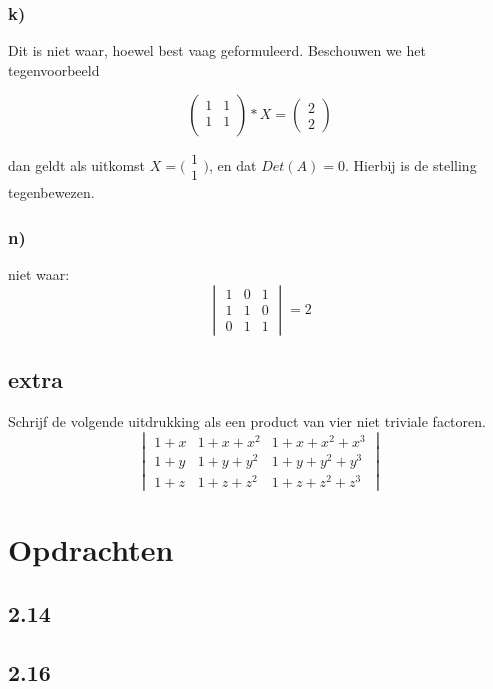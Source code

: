 \documentclass[lineaire_algebra_oplossingen.tex]{subfiles}
\begin{document}
\subsubsection*{k)}

Dit is niet waar, hoewel best vaag geformuleerd. Beschouwen we het tegenvoorbeeld

\[
\begin{pmatrix}
1 & 1\\
1 & 1\\
\end{pmatrix}
* X = 
\begin{pmatrix}
2\\
2
\end{pmatrix}
\]

dan geldt als uitkomst $X = \bigl(\begin{smallmatrix} 1\\ 1 \end{smallmatrix} \bigr)$, en dat $Det(A) = 0$. Hierbij is de stelling tegenbewezen.

\subsubsection*{n)}
niet waar:
\[
\begin{vmatrix}
1 & 0 & 1\\
1 & 1 & 0\\
0 & 1 & 1
\end{vmatrix}
=2
\]

\subsection*{extra}
Schrijf de volgende uitdrukking als een product van vier niet triviale factoren.
\[
\begin{vmatrix}
1+x & 1+x+x^{2} & 1+x+x^{2}+x^{3}\\
1+y & 1+y+y^{2} & 1+y+y^{2}+y^{3}\\
1+z & 1+z+z^{2} & 1+z+z^{2}+z^{3}
\end{vmatrix}
\]

\section{Opdrachten}
\subsection{2.14}
\subsection{2.16}
\end{document}
